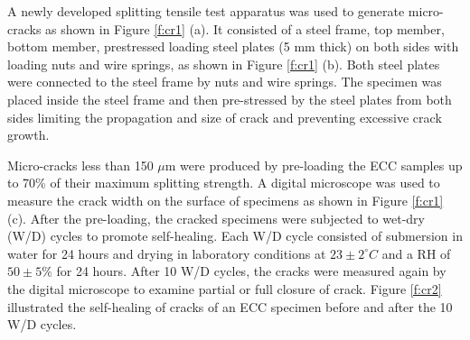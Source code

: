 \documentclass[11pt]{article}
\begin{document}
A newly developed splitting tensile test apparatus was used to generate micro-cracks as shown in Figure \ref{f:cr1} (a). It consisted of a steel frame, top member, bottom member, prestressed loading steel plates (5 mm thick) on both sides with loading nuts and wire springs, as shown in Figure \ref{f:cr1} (b). Both steel plates were connected to the steel frame by nuts and wire springs. The specimen was placed inside the steel frame and then pre-stressed by the steel plates from both sides limiting the propagation and size of crack and preventing excessive crack growth.

Micro-cracks less than 150 $\mu$m were produced by pre-loading the ECC samples up to 70\% of their maximum splitting strength. A digital microscope was used to measure the crack width on the surface of specimens as shown in Figure \ref{f:cr1} (c). After the pre-loading, the cracked specimens were subjected to wet-dry (W/D) cycles to promote self-healing. Each W/D cycle consisted of submersion in water  for 24 hours and drying in laboratory conditions at $23 \pm 2^\circ C$ and a RH of $50 \pm 5\%$ for 24 hours. After 10 W/D cycles, the cracks were measured again by the digital microscope to examine partial or full closure of crack. Figure \ref{f:cr2} illustrated the self-healing of cracks of an ECC specimen before and after the 10 W/D cycles.
\end{document}
